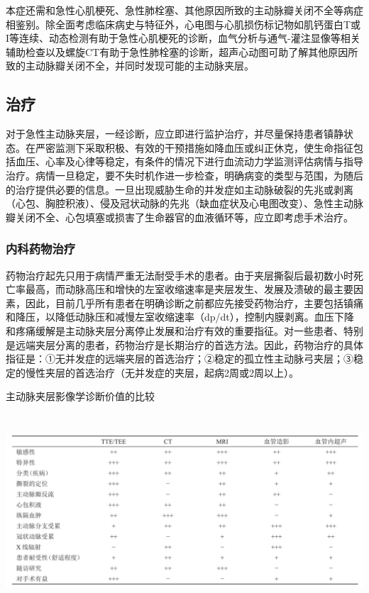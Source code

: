 本症还需和急性心肌梗死、急性肺栓塞、其他原因所致的主动脉瓣关闭不全等病症相鉴别。除全面考虑临床病史与特征外，心电图与心肌损伤标记物如肌钙蛋白T或I等连续、动态检测有助于急性心肌梗死的诊断，血气分析与通气-灌注显像等相关辅助检查以及螺旋CT有助于急性肺栓塞的诊断，超声心动图可助了解其他原因所致的主动脉瓣关闭不全，并同时发现可能的主动脉夹层。

\subsection{治疗}

对于急性主动脉夹层，一经诊断，应立即进行监护治疗，并尽量保持患者镇静状态。在严密监测下采取积极、有效的干预措施如降血压或纠正休克，使生命指征包括血压、心率及心律等稳定，有条件的情况下进行血流动力学监测评估病情与指导治疗。病情一旦稳定，要不失时机作进一步检查，明确病变的类型与范围，为随后的治疗提供必要的信息。一旦出现威胁生命的并发症如主动脉破裂的先兆或剥离（心包、胸腔积液）、侵及冠状动脉的先兆（缺血症状及心电图改变）、急性主动脉瓣关闭不全、心包填塞或损害了生命器官的血液循环等，应立即考虑手术治疗。

\subsubsection{内科药物治疗}

药物治疗起先只用于病情严重无法耐受手术的患者。由于夹层撕裂后最初数小时死亡率最高，而动脉高压和增快的左室收缩速率是夹层发生、发展及溃破的最主要因素，因此，目前几乎所有患者在明确诊断之前都应先接受药物治疗，主要包括镇痛和降压，以降低动脉压和减慢左室收缩速率（dp/dt），控制内膜剥离。血压下降和疼痛缓解是主动脉夹层分离停止发展和治疗有效的重要指征。对一些患者、特别是远端夹层分离的患者，药物治疗是长期治疗的首选方法。因此，药物治疗的具体指征是：①无并发症的远端夹层的首选治疗；②稳定的孤立性主动脉弓夹层；③稳定的慢性夹层的首选治疗（无并发症的夹层，起病2周或2周以上）。

\begin{table}[htbp]
\centering
\caption{主动脉夹层影像学诊断价值的比较}
\label{tab109-2}
\includegraphics[width=6.66667in,height=2.85417in]{./images/Image00486.jpg}
\end{table}

